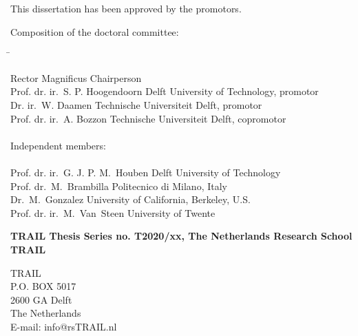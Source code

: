 \begin{small}

\noindent This dissertation has been approved by the promotors.\\
\bigskip{}

\noindent Composition of the doctoral committee:
\smallskip{}

\noindent \begin{flushleft}\begin{tabbing}
\hspace*{70mm}\=\kill

Rector Magnificus \> Chairperson\\
Prof. dr. ir.\ S. P. Hoogendoorn \> Delft University of Technology, promotor\\
Dr. ir.\ W. Daamen \> Technische Universiteit Delft, promotor\\
Prof. dr. ir.\ A. Bozzon \> Technische Universiteit Delft, copromotor\\
\bigskip{}\\

\noindent Independent members:\\
\\

Prof. dr. ir.\ G. J. P. M.\ Houben \> Delft University of Technology\\
Prof. dr.\ M.\ Brambilla \> Politecnico di Milano, Italy\\
Dr.\ M.\ Gonzalez \> University of California, Berkeley, U.S.\\
Prof. dr. ir.\ M.\ Van\ Steen \> University of Twente\\
\end{tabbing}\end{flushleft}

\vspace*{\fill}


\bigskip{}
\noindent\textbf{TRAIL Thesis Series no. T2020/xx, The Netherlands Research School TRAIL}\\
\smallskip{}

\noindent TRAIL\\
P.O. BOX 5017\\
2600 GA Delft\\
The Netherlands\\
E-mail: info@rsTRAIL.nl\\
\bigskip{}


\end{small}
